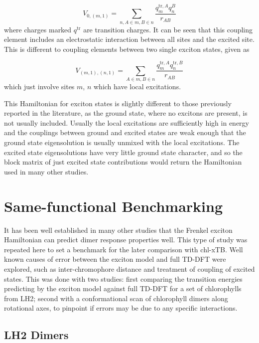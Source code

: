 \begin{equation}
    V_{0, \left(m,1\right)} = \sum_{n, A \in m, B \in n} \frac{q^{\text{tr},A}_m q^B_n}{r_{AB}}
\end{equation}
%
where charges marked $q^{\text{tr}}$ are transition charges. It can be seen that 
this coupling element includes an electrostatic interaction between all sites and
the excited site. This is different to coupling elements between two single exciton
states, given as

\begin{equation}
    V_{\left(m, 1\right), \left(n,1\right)} = \sum_{A \in m, B \in n} \frac{q^{\text{tr},A}_m q^{\text{tr},B}_n}{r_{AB}}
    \label{eq:exciton_coupling}
\end{equation}
%
which just involve sites $m$, $n$ which have local excitations.

This Hamiltonian for exciton states is slightly different to those previously reported 
in the literature, as the ground state, where no excitons are present, is not usually
included. Usually the local excitations are sufficiently high in energy and the
couplings between ground and excited states are weak enough that the ground state 
eigensolution is usually unmixed with the local excitations. The excited state eigensolutions
have very little ground state character, and so the block matrix of just excited
state contributions would return the Hamiltonian used in many other studies.

\section{Same-functional Benchmarking}
\label{sec:exction_v_full_dimer}

It has been well established in many other studies that the Frenkel exciton Hamiltonian
can predict dimer response properties well. This type of study was repeated here
to set a benchmark for the later comparison with chl-xTB. Well known causes of error
between the exciton model and full TD-DFT were explored, such as inter-chromophore
distance and treatment of coupling of excited states. This was done with two studies:
first comparing the transition energies predicting by the exciton model against 
full TD-DFT for a set of chlorophylls from LH2; second with a conformational scan
of chlorophyll dimers along rotational axes, to pinpoint if errors may be due to
any specific interactions.

\subsection{LH2 Dimers}
\label{subsec:LH2_exciton_camb3lyp}

